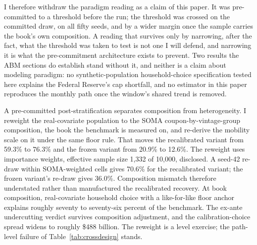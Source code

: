\documentclass[12pt]{article}
\begin{document}
I therefore withdraw the paradigm reading as a claim of this paper. It was pre-committed to a threshold before the run; the threshold was crossed on the committed draw, on all fifty seeds, and by a wider margin once the sample carries the book's own composition. A reading that survives only by narrowing, after the fact, what the threshold was taken to test is not one I will defend, and narrowing it is what the pre-commitment architecture exists to prevent. Two results the ABM sections do establish stand without it, and neither is a claim about modeling paradigm: no synthetic-population household-choice specification tested here explains the Federal Reserve's cap shortfall, and no estimator in this paper reproduces the monthly path once the window's shared trend is removed.

A pre-committed post-stratification separates composition from heterogeneity. I reweight the real-covariate population to the SOMA coupon-by-vintage-group composition, the book the benchmark is measured on, and re-derive the mobility scale on it under the same floor rule. That moves the recalibrated variant from 59.3\% to 76.3\% and the frozen variant from 20.9\% to 12.6\%. The reweight uses importance weights, effective sample size 1{,}332 of 10{,}000, disclosed. A seed-42 re-draw within SOMA-weighted cells gives 70.6\% for the recalibrated variant; the frozen variant's re-draw gives 36.0\%. Composition mismatch therefore understated rather than manufactured the recalibrated recovery. At book composition, real-covariate household choice with a like-for-like floor anchor explains roughly seventy to seventy-six percent of the benchmark. The ex-ante undercutting verdict survives composition adjustment, and the calibration-choice spread widens to roughly \$488 billion. The reweight is a level exercise; the path-level failure of Table~\ref{tab:crossdesign} stands.
\end{document}
